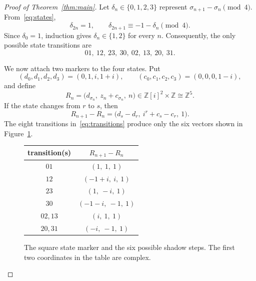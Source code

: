 \documentclass[10pt,reqno]{amsart}
\newcommand{\Z}{\mathbb Z}
\begin{document}
\begin{proof}[Proof of Theorem~\ref{thm:main}]
Let $\delta_n\in\{0,1,2,3\}$ represent
$\sigma_{n+1}-\sigma_n\pmod4$.  From~\eqref{eq:states},
\begin{equation}\label{eq:increments}
 \delta_{2n}=1,
 \qquad
 \delta_{2n+1}\equiv-1-\delta_n\pmod4.
\end{equation}
Since $\delta_0=1$, induction gives $\delta_n\in\{1,2\}$ for every $n$.
Consequently, the only possible state transitions are
\begin{equation}\label{eq:transitions}
 01,\ 12,\ 23,\ 30,\ 02,\ 13,\ 20,\ 31.
\end{equation}

We now attach two markers to the four states.  Put
\begin{equation}\label{eq:markers}
 (d_0,d_1,d_2,d_3)=(0,1,i,1+i),
 \qquad
 (c_0,c_1,c_2,c_3)=(0,0,0,1-i),
\end{equation}
and define
\begin{equation}\label{eq:shadow}
 R_n=\bigl(d_{\sigma_n},\ z_n+c_{\sigma_n},\ n\bigr)
 \in\Z[i]^2\times\Z\cong\Z^5.
\end{equation}
If the state changes from $r$ to $s$, then
\begin{equation}\label{eq:shadow-step}
 R_{n+1}-R_n
 =\bigl(d_s-d_r,\ i^r+c_s-c_r,\ 1\bigr).
\end{equation}
The eight transitions in~\eqref{eq:transitions} produce only the six vectors
shown in Figure~\ref{fig:steps}.

\begin{figure}[htb]
\centering
\begin{minipage}[c]{.29\linewidth}
\centering
{}
\end{minipage}\hfill
\begin{minipage}[c]{.67\linewidth}
\centering
\begin{tabular}{c@{\qquad}c}
\toprule
transition(s) & $R_{n+1}-R_n$ \\
\midrule
$01$       & $(1,\ 1,\ 1)$ \\
$12$       & $(-1+i,\ i,\ 1)$ \\
$23$       & $(1,\ -i,\ 1)$ \\
$30$       & $(-1-i,\ -1,\ 1)$ \\
$02,13$    & $(i,\ 1,\ 1)$ \\
$20,31$    & $(-i,\ -1,\ 1)$ \\
\bottomrule
\end{tabular}
\end{minipage}
\caption{The square state marker and the six possible shadow steps.  The first
two coordinates in the table are complex.}
\label{fig:steps}
\end{figure}


\end{proof}
\end{document}
